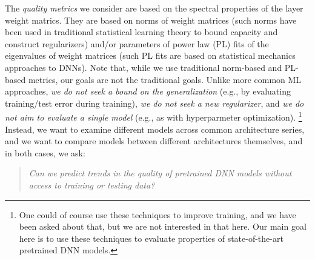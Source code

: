 The \emph{quality metrics} we consider are based on the spectral properties of the layer weight matrics.
They are based on norms of weight matrices (such norms have been used in traditional statistical learning theory to bound capacity and construct regularizers) and/or parameters of power law (PL) fits of the eigenvalues of weight matrices (such PL fits are based on statistical mechanics approaches to DNNs).
Note that, while we use traditional norm-based and PL-based metrics, our goals are not the traditional goals.
Unlike more common ML approaches, \emph{we do not seek a bound on the generalization} (e.g., by evaluating training/test error during training), \emph{we do not seek a new regularizer}, and \emph{we do not aim to evaluate a single model} (e.g., as with hyperparmeter optimization).%
\footnote{One could of course use these techniques to improve training, and we have been asked about that, but we are not interested in that here. Our main goal here is to use these techniques to evaluate properties of state-of-the-art pretrained DNN models.}
Instead, we want to examine different models across common architecture series, and we want to compare models between different architectures themselves, and in both cases, we ask:
\begin{quote}
\emph{Can we predict trends in the quality of pretrained DNN models without access to training or testing data?}  
\end{quote}




